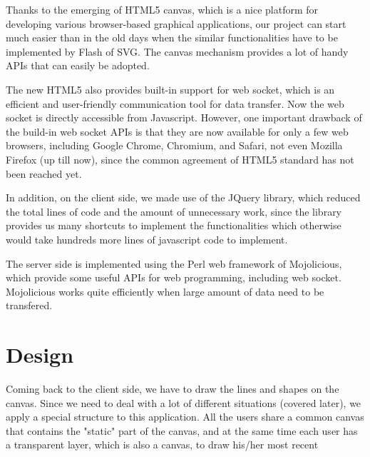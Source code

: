 \documentclass[a4paper,11pt,twocolumn]{article}
\begin{document}
Thanks to the emerging of HTML5 canvas, which is a nice platform for
developing various browser-based graphical applications, our project can start
much easier than in the old days when the similar functionalities have to be
implemented by Flash of SVG. The canvas mechanism provides a lot of handy APIs
that can easily be adopted.

The new HTML5 also provides built-in support for web socket, which is an
efficient and user-friendly communication tool for data transfer. Now the web
socket is directly accessible from Javascript. However, one important drawback
of the build-in web socket APIs is that they are now available for only a few
web browsers, including Google Chrome, Chromium, and Safari, not even
Mozilla Firefox (up till now), since the common agreement of HTML5 standard
has not been reached yet.

In addition, on the client side, we made use of the JQuery library, which 
reduced the total lines of code and the amount of unnecessary work, since the 
library provides us many shortcuts to implement the functionalities which 
otherwise would take hundreds more lines of javascript code to implement.

The server side is implemented using the Perl web framework of Mojolicious,
which provide some useful APIs for web programming, including web socket.
Mojolicious works quite efficiently when large amount of data need to be
transfered.

\section{Design}

Coming back to the client side, we have to draw the lines and shapes on the
canvas. Since we need to deal with a lot of different situations (covered
later), we apply a special structure to this application. All the users share
a common canvas that contains the "static" part of the canvas, and at the same
time each user has a transparent layer, which is also a canvas, to draw
his/her most recent 
\end{document}
